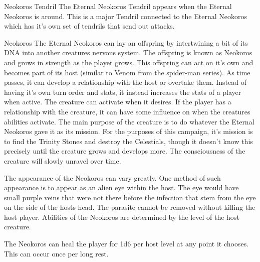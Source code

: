 \begin{monsterbox}{Neokoros Tendril}
	\details[%
	languages = {All},
	challenge = 15
	]
	\dndline%
	The Eternal Neokoros Tendril appears when the Eternal Neokoros is around. This is a major Tendril connected to the Eternal Neokoros which has it's own set of tendrils that send out attacks.
\end{monsterbox}

\begin{commentbox}{Neokoros}
	The Eternal Neokoros can lay an offspring by intertwining a bit of its DNA into another creatures nervous system. The offspring is known as Neokoros and grows in strength as the player grows. This offspring can act on it's own and becomes part of its host (similar to Venom from the spider-man series). As time passes, it can develop a relationship with the host or overtake them. Instead of having it's own turn order and stats, it instead increases the stats of a player when active. The creature can activate when it desires. If the player has a relationship with the creature, it can have some influence on when the creatures abilities activate. The main purpose of the creature is to do whatever the Eternal Neokoros gave it as its mission. For the purposes of this campaign, it's mission is to find the Trinity Stones and destroy the Celestials, though it doesn't know this precisely until the creature grows and develops more. The consciousness of the creature will slowly unravel over time.
	
	The appearance of the Neokoros can vary greatly. One method of such appearance is to appear as an alien eye within the host. The eye would have small purple veins that were not there before the infection that stem from the eye on the side of the hosts head. The parasite cannot be removed without killing the host player. Abilities of the Neokoros are determined by the level of the host creature.
	
	The Neokoros can heal the player for 1d6 per host level at any point it chooses. This can occur once per long rest.
	

\end{commentbox}
